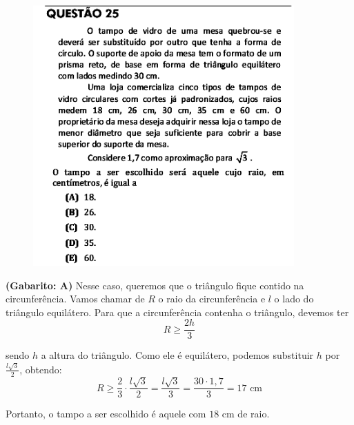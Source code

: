 \documentclass[a4paper]{article}
\begin{document}
\begin{figure}[H]
	\begin{center}
		\includegraphics[width=10cm]{L5Q25.png}
	\end{center}
\end{figure}
\par\textbf{(Gabarito: A)} Nesse caso, queremos que o triângulo fique contido na circunferência. Vamos chamar de $R$ o raio da circunferência e $l$ o lado do triângulo equilátero. Para que a circunferência contenha o triângulo, devemos ter
\begin{equation*}
R\geq \frac{2h}{3}
\end{equation*}
\par\vspace{0.3cm} sendo $h$ a altura do triângulo. Como ele é equilátero, podemos substituir $h$ por $\displaystyle{ \frac{l\sqrt{3}}{2} }$, obtendo:
\begin{equation*}
R\geq \frac{2}{3}\cdot\frac{l\sqrt{3}}{2} = \frac{l\sqrt{3}}{3} = \frac{30\cdot 1,7}{3} = 17\text{ cm}
\end{equation*}
\par\vspace{0.3cm} Portanto, o tampo a ser escolhido é aquele com $18$ cm de raio.
\end{document}
